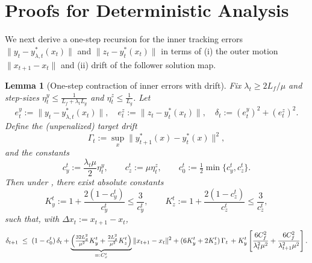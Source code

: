 \documentclass{uai2026} %
\newtheorem{lemma}{Lemma}[section]
\begin{document}
\section{Proofs for Deterministic Analysis}
We next derive a one-step recursion for the inner tracking errors $\|y_{t}-y^{*}_{\lambda,t}(x_{t})\|$ and $\|z_{t}-y^{*}_{t}(x_{t})\|$
in terms of (i) the outer motion $\|x_{t+1}-x_t\|$ and (ii) drift of the follower solution map.
\begin{lemma}[One-step contraction of inner errors with drift]
\label{lem:tracking}
Fix $\lambda_{t}\ge 2L_f/\mu$ and step-sizes $\eta_t^y\le \frac{1}{L_f+\lambda_{t} L_g}$ and $\eta_t^z\le \frac{1}{L_g}$.
Let
\[
e_t^y:=\bigl\|y_t-y^{*}_{\lambda,t}(x_t)\bigr\|,
\quad
e_t^z:=\bigl\|z_t-y^{*}_t(x_t)\bigr\|,
\quad
\delta_t:=(e_t^y)^2+(e_t^z)^2.
\]
Define the (unpenalized) target drift
\[
\Gamma_t:=\sup_x\bigl\|y^{*}_{t+1}(x)-y^{*}_{t}(x)\bigr\|^2,
\]
and the constants
\[
c_y^{t}:=\frac{\lambda_t\mu}{2}\eta_{t}^{y},\qquad
c_z^{t}:=\mu\eta_{t}^{z},\qquad
c_0^{t}:=\tfrac12\min\{c_y^{t},c_z^{t}\}.
\]
Then under , there exist absolute constants
\[
K_y^{t}:=1+\frac{2(1-c_y^{t})}{c_y^{t}}\le \frac{3}{c_y^{t}},\qquad
K_z^{t}:=1+\frac{2(1-c_z^{t})}{c_z^{t}}\le \frac{3}{c_z^{t}},
\]
such that, with $\Delta x_t:=x_{t+1}-x_t$,
\begin{align}
    \delta_{t+1}
\;\le\;
(1-c_0^{t})\,\delta_t
+\underbrace{\Bigl(\tfrac{32L_g^2}{\mu^2}K_y^{t}+\tfrac{2L_g^2}{\mu^2}K_z^{t}\Bigr)}_{=:C_x^{t}}\|x_{t+1}-x_t\|^2
+(6K_y^{t}+2K_z^{t})\,\Gamma_t\,+K_{y}^{t}\left[\frac{6C_{f}^{2}}{\lambda_{t}^{2}\mu^{2}}+\frac{6C_{f}^{2}}{\lambda_{t+1}^{2}\mu^{2}}\right].
\end{align}
\end{lemma}
\end{document}
